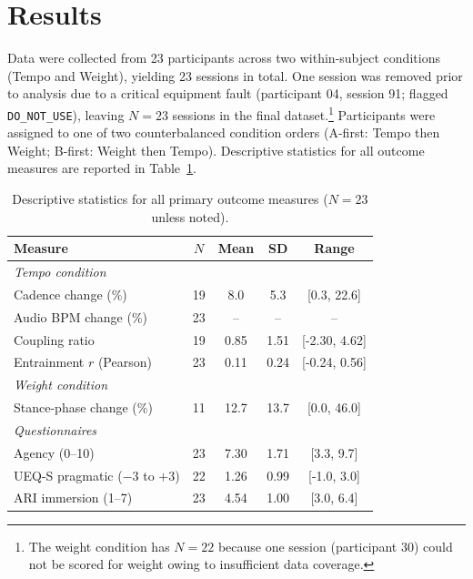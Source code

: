 
\section{Results}
\label{sec:results}

Data were collected from 23 participants across two within-subject conditions
(Tempo and Weight), yielding 23 sessions in total. One session was removed prior
to analysis due to a critical equipment fault (participant 04, session 91;
flagged \texttt{DO\_NOT\_USE}), leaving \(N = 23\) sessions in the final
dataset.\footnote{The weight condition has \(N = 22\) because one session
(participant 30) could not be scored for weight owing to insufficient data
coverage.}
Participants were assigned to one of two counterbalanced condition orders
(A-first: Tempo then Weight; B-first: Weight then Tempo).
Descriptive statistics for all outcome measures are reported in
Table~\ref{tab:descriptive}.

\begin{table}[ht]
\centering
\caption{Descriptive statistics for all primary outcome measures
         ($N = 23$ unless noted).}
\label{tab:descriptive}
\begin{tabular}{lcccc}
\hline
\textbf{Measure} & \textbf{$N$} & \textbf{Mean} & \textbf{SD}
                 & \textbf{Range} \\
\hline
\multicolumn{5}{l}{\textit{Tempo condition}} \\
\quad Cadence change (\%) & 19 & 8.0 & 5.3 & [0.3, 22.6] \\
\quad Audio BPM change (\%) & 23 & -- & -- & -- \\
\quad Coupling ratio & 19 & 0.85 & 1.51 & [-2.30, 4.62] \\
\quad Entrainment $r$ (Pearson) & 23 & 0.11 & 0.24 & [-0.24, 0.56] \\
\hline
\multicolumn{5}{l}{\textit{Weight condition}} \\
\quad Stance-phase change (\%) & 11 & 12.7 & 13.7 & [0.0, 46.0] \\
\hline
\multicolumn{5}{l}{\textit{Questionnaires}} \\
\quad Agency (0--10) & 23 & 7.30 & 1.71 & [3.3, 9.7] \\
\quad UEQ-S pragmatic ($-3$ to $+3$) & 22 & 1.26 & 0.99 & [-1.0, 3.0] \\
\quad ARI immersion (1--7) & 23 & 4.54 & 1.00 & [3.0, 6.4] \\
\hline
\end{tabular}
\end{table}

